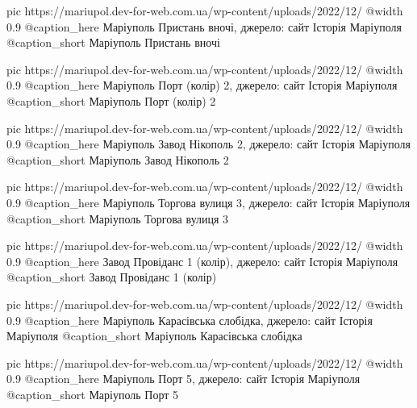 	pic https://mariupol.dev-for-web.com.ua/wp-content/uploads/2022/12/%
	@width 0.9
	@caption_here Маріуполь Пристань вночі, джерело: сайт Історія Маріуполя
	@caption_short Маріуполь Пристань вночі

	pic https://mariupol.dev-for-web.com.ua/wp-content/uploads/2022/12/%
	@width 0.9
	@caption_here Маріуполь Порт (колір) 2, джерело: сайт Історія Маріуполя
	@caption_short Маріуполь Порт (колір) 2

	pic https://mariupol.dev-for-web.com.ua/wp-content/uploads/2022/12/%
	@width 0.9
	@caption_here Маріуполь Завод Нікополь 2, джерело: сайт Історія Маріуполя
	@caption_short Маріуполь Завод Нікополь 2

	pic https://mariupol.dev-for-web.com.ua/wp-content/uploads/2022/12/%
	@width 0.9
	@caption_here Маріуполь Торгова вулиця 3, джерело: сайт Історія Маріуполя
	@caption_short Маріуполь Торгова вулиця 3

	pic https://mariupol.dev-for-web.com.ua/wp-content/uploads/2022/12/%
	@width 0.9
	@caption_here Завод Провіданс 1 (колір), джерело: сайт Історія Маріуполя
	@caption_short Завод Провіданс 1 (колір)

	pic https://mariupol.dev-for-web.com.ua/wp-content/uploads/2022/12/%
	@width 0.9
	@caption_here Маріуполь Карасівська слобідка, джерело: сайт Історія Маріуполя
	@caption_short Маріуполь Карасівська слобідка

	pic https://mariupol.dev-for-web.com.ua/wp-content/uploads/2022/12/%
	@width 0.9
	@caption_here Маріуполь Порт 5, джерело: сайт Історія Маріуполя
	@caption_short Маріуполь Порт 5

